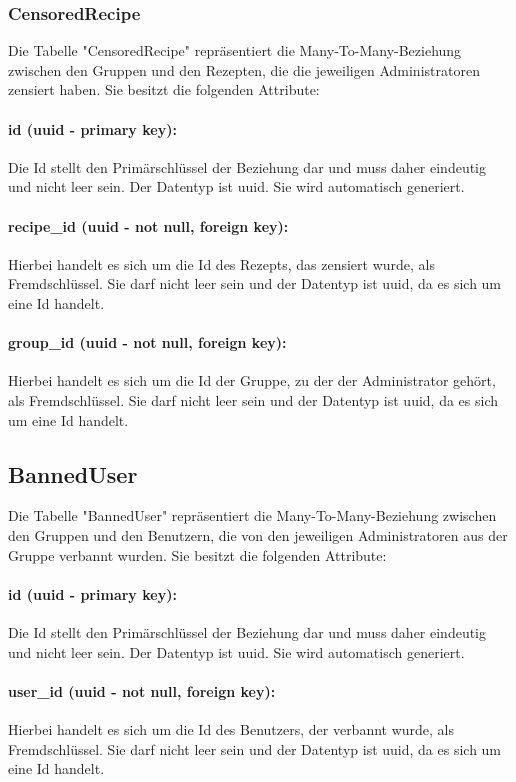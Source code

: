 \documentclass[parskip=full]{scrartcl}
\begin{document}
\subsubsection{CensoredRecipe}
Die Tabelle "CensoredRecipe" repräsentiert die Many-To-Many-Beziehung zwischen den Gruppen und den Rezepten, die die jeweiligen Administratoren zensiert haben. Sie besitzt die folgenden Attribute:
\paragraph{id (uuid - primary key):} Die Id stellt den Primärschlüssel der Beziehung dar und muss daher eindeutig und nicht leer sein. Der Datentyp ist \Gls{uuid}. Sie wird automatisch generiert.
\paragraph{recipe\_id (uuid - not null, foreign key):} Hierbei handelt es sich um die Id des Rezepts, das zensiert wurde, als Fremdschlüssel. Sie darf nicht leer sein und der Datentyp ist \Gls{uuid}, da es sich um eine Id handelt.
\paragraph{group\_id (uuid - not null, foreign key):} Hierbei handelt es sich um die Id der Gruppe, zu der der Administrator gehört, als Fremdschlüssel. Sie darf nicht leer sein und der Datentyp ist \Gls{uuid}, da es sich um eine Id handelt.
\newpage

\subsection{BannedUser}
Die Tabelle "BannedUser" repräsentiert die Many-To-Many-Beziehung zwischen den Gruppen und den Benutzern, die von den jeweiligen Administratoren aus der Gruppe verbannt wurden. Sie besitzt die folgenden Attribute:
\paragraph{id (uuid - primary key):} Die Id stellt den Primärschlüssel der Beziehung dar und muss daher eindeutig und nicht leer sein. Der Datentyp ist \Gls{uuid}. Sie wird automatisch generiert.
\paragraph{user\_id (uuid - not null, foreign key):} Hierbei handelt es sich um die Id des Benutzers, der verbannt wurde, als Fremdschlüssel. Sie darf nicht leer sein und der Datentyp ist \Gls{uuid}, da es sich um eine Id handelt.
\end{document}
